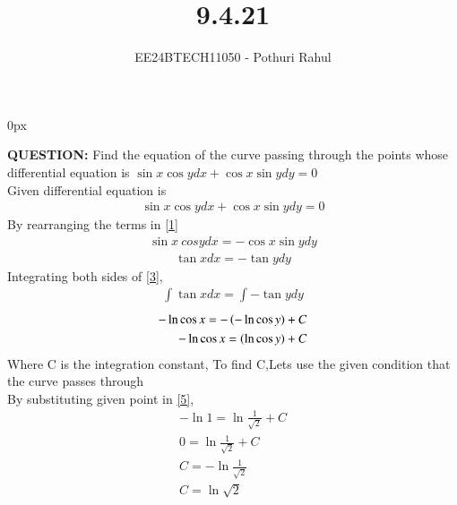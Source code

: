 \documentclass[journal]{IEEEtran}
\begin{document}

\vspace{3cm}
\parindent 0px

\title{9.4.21}
\author{EE24BTECH11050 - Pothuri Rahul}
{\let\newpage\relax\maketitle}

\renewcommand{\thefigure}{\theenumi}
\renewcommand{\thetable}{\theenumi}
\setlength{\intextsep}{10pt} %


\renewcommand{\thetable}{\theenumi}
\textbf{QUESTION: } Find the equation of the curve passing through the points 
 whose differential equation is $\sin{x} \cos{y}dx+\cos{x} \sin{y} dy =0$ \\
\solution 
Given differential equation is 
\begin{align}
\sin{x} \cos{y}dx+\cos{x} \sin{y} dy =0 \label{1}
\end{align}
By rearranging the terms in \eqref{1} 
\begin{align}
\sin{x} \ cos{y} dx = - \cos{x} \sin{y} dy \label{2}
\end{align}
\begin{align}
\tan{x} dx = - \tan{y} dy \label{3}
\end{align}
Integrating both sides of \eqref{3}, 
\begin{align}
\int \tan{x} dx = \int - \tan{y} dy \label{4}
\end{align}
\begin{align}
-\ln{\cos{x}} = - \left(-\ln{\cos{y}}\right) + C \label{5} \\
-\ln{\cos{x}} =  \left(\ln{\cos{y}}\right) + C \label{6}
\end{align}
Where C is the integration constant, To find C,Lets use the given condition that the curve passes through  \\
By substituting given point in \eqref{5},
\begin{align}
-\ln{1} = \ln{\frac{1}{\sqrt{2}}} + C \\ 
0 = \ln{\frac{1}{\sqrt{2}}} + C \\
C = -  \ln{\frac{1}{\sqrt{2}}} \\
C = \ln{\sqrt{2}} \label{10}
\end{align}
\end{document}

